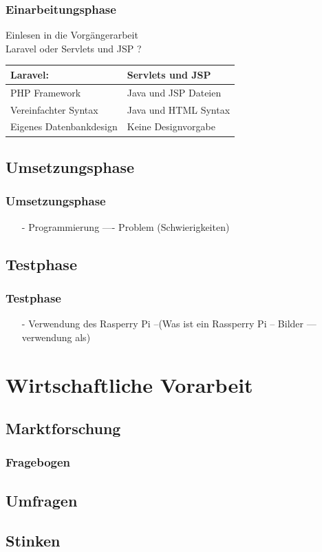 \documentclass[12pt]{beamer}
\begin{document}
\begin{frame}
\frametitle{Einarbeitungsphase}
\begin{Large}
Einlesen in die Vorgängerarbeit\\ \vspace{0.2 cm}
Laravel oder Servlets und JSP ? \vspace{1 cm}
\end{Large}

\begin{tabular}{l|l}
\textbf{Laravel:} & \textbf{Servlets und JSP}\\ \hline
PHP Framework & Java und JSP Dateien\\
Vereinfachter Syntax & Java und HTML Syntax\\
Eigenes Datenbankdesign & Keine Designvorgabe
\end{tabular}

\end{frame}

\subsection{Umsetzungsphase}
\begin{frame}
\frametitle{Umsetzungsphase}
\begin{itemize}
	\item[-] Programmierung ---- Problem (Schwierigkeiten)
\end{itemize}
\end{frame}


\subsection{Testphase}
\begin{frame}
\frametitle{Testphase}
	\begin{itemize}
		\item[-] Verwendung des Rasperry Pi --(Was ist ein Rassperry Pi -- Bilder --- verwendung als)
	\end{itemize}
\end{frame}

\section{Wirtschaftliche Vorarbeit}
\subsection{Marktforschung}
\begin{frame}
\frametitle{Fragebogen}
\end{frame}

\subsection{Umfragen}

\begin{frame}

\end{frame}

\subsection{Stinken}
\begin{frame}

\end{frame}

\begin{figure}
	\listoffigures
\end{figure}
\end{document}
